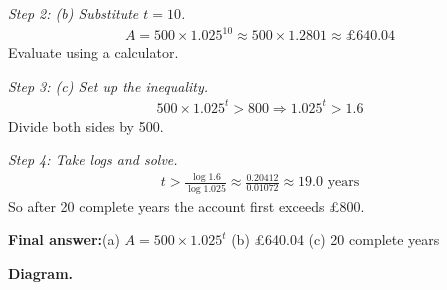 \documentclass[11pt]{article}
\begin{document}
\textit{Step 2: (b) Substitute \( t = 10 \).}
\[\begin{gathered}
A = 500 \times 1.025^{10} \approx 500 \times 1.2801 \approx \pounds 640.04
\end{gathered}\]
Evaluate using a calculator.

\textit{Step 3: (c) Set up the inequality.}
\[\begin{gathered}
500 \times 1.025^t > 800 \Rightarrow 1.025^t > 1.6
\end{gathered}\]
Divide both sides by 500.

\textit{Step 4: Take logs and solve.}
\[\begin{gathered}
t > \frac{\log 1.6}{\log 1.025} \approx \frac{0.20412}{0.01072} \approx 19.0 \text{ years}
\end{gathered}\]
So after 20 complete years the account first exceeds \pounds 800.

\begin{answerbox}
\textbf{Final answer:}\quad (a) \(\displaystyle  A = 500 \times 1.025^t \) \quad  (b) \pounds 640.04 \quad  (c) 20 complete years
\end{answerbox}
\textbf{Diagram.}
\end{document}
